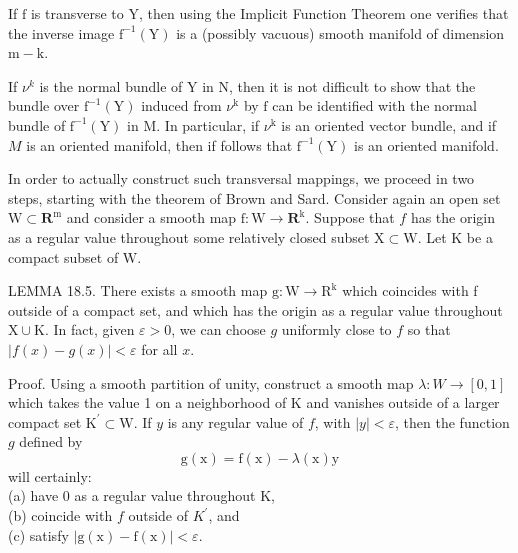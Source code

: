 \documentclass[10pt]{article}
\begin{document}
If $\mathrm{f}$ is transverse to $\mathrm{Y}$, then using the Implicit Function Theorem one verifies that the inverse image $\mathrm{f}^{-1}(\mathrm{Y})$ is a (possibly vacuous) smooth manifold of dimension $\mathrm{m}-\mathrm{k}$.

If $\nu^{k}$ is the normal bundle of $\mathrm{Y}$ in $\mathrm{N}$, then it is not difficult to show that the bundle over $\mathrm{f}^{-1}(\mathrm{Y})$ induced from $\nu^{\mathrm{k}}$ by $\mathrm{f}$ can be identified with the normal bundle of $\mathrm{f}^{-1}(\mathrm{Y})$ in $\mathrm{M}$. In particular, if $\nu^{\mathrm{k}}$ is an oriented vector bundle, and if $M$ is an oriented manifold, then if follows that $\mathrm{f}^{-1}(\mathrm{Y})$ is an oriented manifold.

In order to actually construct such transversal mappings, we proceed in two steps, starting with the theorem of Brown and Sard. Consider again an open set $\mathrm{W} \subset \mathbf{R}^{\mathrm{m}}$ and consider a smooth map $\mathrm{f}: \mathrm{W} \rightarrow \mathbf{R}^{\mathrm{k}}$. Suppose that $f$ has the origin as a regular value throughout some relatively closed subset $\mathrm{X} \subset \mathrm{W}$. Let $\mathrm{K}$ be a compact subset of $\mathrm{W}$.

LEMMA 18.5. There exists a smooth map $\mathrm{g}: \mathrm{W} \rightarrow \mathrm{R}^{\mathrm{k}}$ which coincides with f outside of a compact set, and which has the origin as a regular value throughout $\mathrm{X} \cup \mathrm{K}$. In fact, given $\varepsilon>0$, we can choose $g$ uniformly close to $f$ so that $|f(x)-g(x)|<\varepsilon$ for all $x$.

Proof. Using a smooth partition of unity, construct a smooth map $\lambda: W \rightarrow[0,1]$ which takes the value 1 on a neighborhood of $\mathrm{K}$ and vanishes outside of a larger compact set $\mathrm{K}^{\prime} \subset \mathrm{W}$. If $y$ is any regular value of $f$, with $|y|<\varepsilon$, then the function $g$ defined by
$$
\mathrm{g}(\mathrm{x})=\mathrm{f}(\mathrm{x})-\lambda(\mathrm{x}) \mathrm{y}
$$
will certainly:\\
(a) have 0 as a regular value throughout $\mathrm{K}$,\\
(b) coincide with $f$ outside of $K^{\prime}$, and\\
(c) satisfy $|\mathrm{g}(\mathrm{x})-\mathrm{f}(\mathrm{x})|<\varepsilon$.
\end{document}
